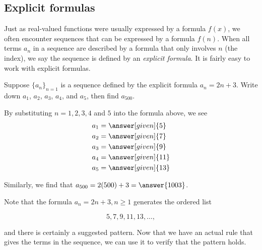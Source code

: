 \documentclass{ximera}
\begin{document}
\subsection{Explicit formulas}

Just as real-valued functions were usually expressed by a formula $f(x)$, we often encounter sequences that can be expressed by a formula $f(n)$.  When all terms $a_n$ in a sequence are described by a formula that only involves $n$ (the index), we say the sequence is defined by an \emph{explicit formula}. It is fairly easy to work with explicit formulas.

\begin{example}
Suppose $\{a_n\}_{n=1}$ is a sequence defined by the explicit formula $a_n = 2n+3$.  Write down $a_1$, $a_2$, $a_3$, $a_4$, and $a_5$, then find $a_{500}$.

  \begin{explanation}
    By substituting $n=1, 2, 3, 4$ and $5$ into the formula above, we see
    \begin{align*}
      a_1 &= \answer[given]{5} \\ 
      a_2 &= \answer[given]{7} \\ 
      a_3 &= \answer[given]{9} \\ 
      a_4 &= \answer[given]{11} \\ 
      a_5 &= \answer[given]{13} 
    \end{align*}

Similarly, we find that $a_{500} = 2(500)+3 = \answer{1003}$.

\end{explanation}

Note that the formula $a_n = 2n+3, n \geq 1$ generates the ordered list 

\[
5,7,9,11,13, \dots ,
\]   

and there is certainly a suggested pattern. Now that we have an actual rule that gives the terms in the sequence, we can use it to verify that the pattern holds.
  
\end{example}

\end{document}
